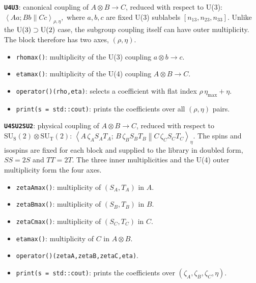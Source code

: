 \documentclass[aps,onecolumn,10pt,superscriptaddress,floatfix,nofootinbib]{revtex4}
\begin{document}
\textbf{\texttt{U4U3}}: canonical coupling of $A\otimes B\to C$, reduced with
respect to U(3):
$
  \left\langle A a; B b \middle\| C c\right\rangle_{\rho,\eta},
$
where $a,b,c$ are fixed U(3) sublabels $[n_{13},n_{23},n_{33}]$.
Unlike the $\rm U(3) \supset U(2)$ case, the subgroup coupling itself can have outer
multiplicity. The block therefore has two axes, $(\rho,\eta)$.
\begin{itemize}
    \item \verb|rhomax()|: multiplicity of the U(3) coupling $a\otimes b\to c$.
    \item \verb|etamax()|: multiplicity of the U(4) coupling $A\otimes B\to C$.
    \item \verb|operator()(rho,eta)|: selects a coefficient with flat index
    $\rho\,\eta_{\max}+\eta$.
    \item \verb|print(s = std::cout)|: prints the coefficients over all $(\rho,\eta)$ pairs.
\end{itemize}

\textbf{\texttt{U4SU2SU2}}: physical coupling of $A\otimes B\to C$, reduced
with respect to $\mathrm{SU_S(2)}\otimes\mathrm{SU_T(2)}$:
$
  \left\langle A\,\zeta_A S_A T_A;\,B\,\zeta_B S_B T_B
  \middle\| C\,\zeta_C S_C T_C\right\rangle_{\eta}.
$
The spins and isospins are fixed for each block and supplied to the library in
doubled form, $SS=2S$ and $TT=2T$. The three inner multiplicities and the U(4)
outer multiplicity form the four axes.
\begin{itemize}
    \item \verb|zetaAmax()|: multiplicity of $(S_A,T_A)$ in $A$.
    \item \verb|zetaBmax()|: multiplicity of $(S_B,T_B)$ in $B$.
    \item \verb|zetaCmax()|: multiplicity of $(S_C,T_C)$ in $C$.
    \item \verb|etamax()|: multiplicity of $C$ in $A\otimes B$.
    \item \verb|operator()(zetaA,zetaB,zetaC,eta)|.
    \item \verb|print(s = std::cout)|: prints the coefficients over
    $(\zeta_A,\zeta_B,\zeta_C,\eta)$.
\end{itemize}
\end{document}
